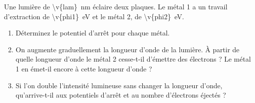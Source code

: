 Une lumière de \qty{\v{lam}}{nm} éclaire deux plaques. Le métal 1 a un travail d'extraction de \qty{\v{phi1}}{eV} et le métal 2, de \qty{\v{phi2}}{eV}.

\begin{enumerate}[label=\alph*)]
    \item Déterminez le potentiel d'arrêt pour chaque métal.
    \item On augmente graduellement la longueur d'onde de la lumière. À partir de quelle longueur d'onde le métal 2 cesse-t-il d'émettre des électrons ? Le métal 1 en émet-il encore à cette longueur d'onde ?
    \item Si l'on double l'intensité lumineuse sans changer la longueur d'onde, qu'arrive-t-il aux potentiels d'arrêt et au nombre d'électrons éjectés ?
\end{enumerate}
